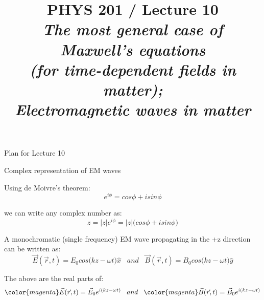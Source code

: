 \renewcommand{\prevlecture}{9 }
\renewcommand{\thislecture}{10 }
\renewcommand{\nextlecture}{11 }

%
%

\title[PHYS 201 / Lecture \thislecture]
{
  PHYS 201 / Lecture \thislecture\\
  {\it The most general case of Maxwell's equations\\
        (for time-dependent fields in matter);\\
        Electromagnetic waves in matter}\\
}



\begin{frame}[plain]
  \titlepage
\end{frame}



%
%

\renewcommand{\lecturesummarytitle}{Revision }


%
%

\begin{frame}{Plan for Lecture \thislecture}


\end{frame}


%
%
%

\begin{frame}{Complex representation of EM waves}

Using de Moivre's theorem:
\begin{equation*}
   e^{i\phi} = cos\phi + i sin\phi
\end{equation*}

we can write any complex number as:
\begin{equation*}
    z =  |z|  e^{i \phi} = |z| \Big( cos\phi + i sin\phi \Big)
\end{equation*}

A monochromatic (single frequency) EM wave propagating in the +z
direction can be written as:
\begin{equation*}
    \vec{E}(\vec{r},t) = E_0 cos\Big(kz-\omega t \Big) \hat{x} \;\;\; and \;\;\;
    \vec{B}(\vec{r},t) = B_0 cos\Big(kz-\omega t \Big) \hat{y}
\end{equation*}

The above are the real parts of:
\begin{equation*}
    {\color{magenta} \vec{E}(\vec{r},t) = \vec{E}_0  e^{i (kz-\omega t)}  }
    \;\;\; and \;\;\;
    {\color{magenta} \vec{B}(\vec{r},t) = \vec{B}_0  e^{i (kz-\omega t)}  }
\end{equation*}

\end{frame}



